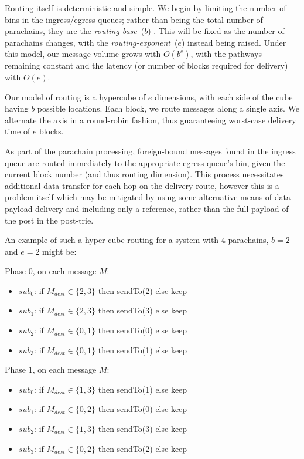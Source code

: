 \documentclass[9pt,oneside]{amsart}
\providecommand{\tightlist}{%
  \setlength{\itemsep}{0pt}\setlength{\parskip}{0pt}}
\begin{document}
\begin{multicols}{2}
 Routing itself is deterministic and simple. We begin by limiting the number of bins in the ingress/egress queues; rather than being the total number of parachains, they are the \emph{routing-base}~($b$) . This will be fixed as the number of parachains changes, with the \emph{routing-exponent}~($e$) instead being raised. Under this model, our message volume grows with $O(b^e)$, with the pathways remaining constant and the latency (or number of blocks required for delivery) with $O(e)$.

 Our model of routing is a hypercube of $e$ dimensions, with each side of the cube having $b$ possible locations. Each block, we route messages along a single axis. We alternate the axis in a round-robin fashion, thus guaranteeing worst-case delivery time of $e$ blocks.

 As part of the parachain processing, foreign-bound messages found in the ingress queue are routed immediately to the appropriate egress queue's bin, given the current block number (and thus routing dimension). This process necessitates additional data transfer for each hop on the delivery route, however this is a problem itself which may be mitigated by using some alternative means of data payload delivery and including only a reference, rather than the full payload of the post in the post-trie.

 An example of such a hyper-cube routing for a system with 4 parachains, $b=2$ and $e=2$ might be:

 Phase 0, on each message $M$:

\begin{itemize}
\tightlist
\item $sub_0$: if $M_{dest} \in \{ 2, 3 \}$ then sendTo(2) else keep
\item $sub_1$: if $M_{dest} \in \{ 2, 3 \}$ then sendTo(3) else keep
\item $sub_2$: if $M_{dest} \in \{ 0, 1 \}$ then sendTo(0) else keep
\item $sub_3$: if $M_{dest} \in \{ 0, 1 \}$ then sendTo(1) else keep
\end{itemize}

 Phase 1, on each message $M$:

\begin{itemize}
\tightlist
\item $sub_0$: if $M_{dest} \in \{ 1, 3 \}$ then sendTo(1) else keep
\item $sub_1$: if $M_{dest} \in \{ 0, 2 \}$ then sendTo(0) else keep
\item $sub_2$: if $M_{dest} \in \{ 1, 3 \}$ then sendTo(3) else keep
\item $sub_3$: if $M_{dest} \in \{ 0, 2 \}$ then sendTo(2) else keep
\end{itemize}


\end{multicols}
\end{document}
